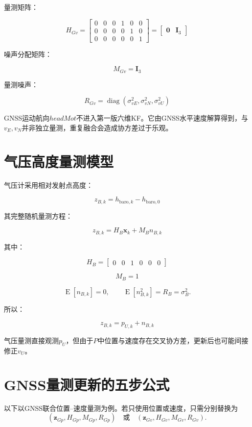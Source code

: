 \documentclass[12pt,a4paper]{ctexart}
\newcommand{\I}{\mathbf I}
\newcommand{\zero}{\mathbf 0}
\newcommand{\E}{\operatorname{E}}
\newcommand{\diag}{\operatorname{diag}}
\begin{document}
量测矩阵：

\[
\boxed{
H_{Gv}
=
\begin{bmatrix}
0&0&0&1&0&0\\
0&0&0&0&1&0\\
0&0&0&0&0&1
\end{bmatrix}
=
\begin{bmatrix}
\zero&\I_3
\end{bmatrix}
}
\]

噪声分配矩阵：

\[
\boxed{M_{Gv}=\I_3}
\]

量测噪声：

\[
\boxed{
R_{Gv}
=
\diag\left(
\sigma_{vE}^2,
\sigma_{vN}^2,
\sigma_{vU}^2
\right)
}
\]

GNSS运动航向$headMot$不进入第一版六维KF。它由GNSS水平速度解算得到，与$v_E,v_N$并非独立量测，重复融合会造成协方差过于乐观。

\section{气压高度量测模型}

气压计采用相对发射点高度：

\[
\boxed{
z_{B,k}
=
h_{\mathrm{baro},k}
-
h_{\mathrm{baro},0}
}
\]

其完整随机量测方程：

\[
\boxed{
z_{B,k}
=
H_B\mathbf x_k
+
M_B n_{B,k}
}
\]

其中：

\[
\boxed{
H_B=
\begin{bmatrix}
0&0&1&0&0&0
\end{bmatrix}
}
\]

\[
\boxed{M_B=1}
\]

\[
\E[n_{B,k}]=0,
\qquad
\E[n_{B,k}^2]=R_B=\sigma_B^2.
\]

所以：

\[
\boxed{
z_{B,k}
=
p_{U,k}
+
n_{B,k}
}
\]

气压量测直接观测$p_U$，但由于$P$中位置与速度存在交叉协方差，更新后也可能间接修正$v_U$。

\section{GNSS量测更新的五步公式}

以下以GNSS联合位置--速度量测为例。若只使用位置或速度，只需分别替换为
\[
(\mathbf z_{Gp},H_{Gp},M_{Gp},R_{Gp})
\quad\text{或}\quad
(\mathbf z_{Gv},H_{Gv},M_{Gv},R_{Gv}).
\]
\end{document}
